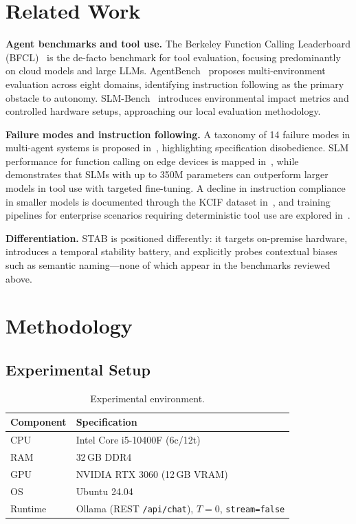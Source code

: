 \documentclass{kdmile}
\begin{document}
\section{Related Work}
\label{sec:related}

\textbf{Agent benchmarks and tool use.}
The Berkeley Function Calling Leaderboard (BFCL)~\cite{patil2025} is the
de-facto benchmark for tool evaluation, focusing predominantly on cloud models
and large LLMs.
AgentBench~\cite{liu2024} proposes multi-environment evaluation across eight
domains, identifying instruction following as the primary obstacle to autonomy.
SLM-Bench~\cite{pham2025} introduces environmental impact metrics and
controlled hardware setups, approaching our local evaluation methodology.

\textbf{Failure modes and instruction following.}
A taxonomy of 14 failure modes in multi-agent systems is proposed
in~\cite{cemri2025}, highlighting specification disobedience.
SLM performance for function calling on edge devices is mapped
in~\cite{kavathekar2025}, while~\cite{jhandi2026} demonstrates that SLMs with
up to 350M parameters can outperform larger models in tool use with targeted
fine-tuning. A decline in instruction compliance in smaller models is documented
through the KCIF dataset in~\cite{murthy2024}, and training pipelines for
enterprise scenarios requiring deterministic tool use are explored
in~\cite{zeng2024}.

\textbf{Differentiation.}
STAB is positioned differently: it targets on-premise hardware, introduces
a temporal stability battery, and explicitly probes contextual biases such as
semantic naming—none of which appear in the benchmarks reviewed above.

\section{Methodology}
\label{sec:method}

\subsection{Experimental Setup}

\begin{table}[H]
\centering
\caption{Experimental environment.}
\label{tab:setup}
\begin{tabular}{ll}
\toprule
\textbf{Component} & \textbf{Specification} \\
\midrule
CPU     & Intel Core i5-10400F (6c/12t) \\
RAM     & 32\,GB DDR4 \\
GPU     & NVIDIA RTX 3060 (12\,GB VRAM) \\
OS      & Ubuntu 24.04 \\
Runtime & Ollama (REST \texttt{/api/chat}), $T=0$, \texttt{stream=false} \\
\bottomrule
\end{tabular}
\end{table}
\end{document}
